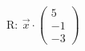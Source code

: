 \documentclass[preview]{standalone}
\begin{document}
\begin{center}
$\mathrm{R: \:} \vec{x} \cdot \begin{pmatrix} 5 \\ -1 \\ -3 \end{pmatrix}$
\end{center}
\end{document}
